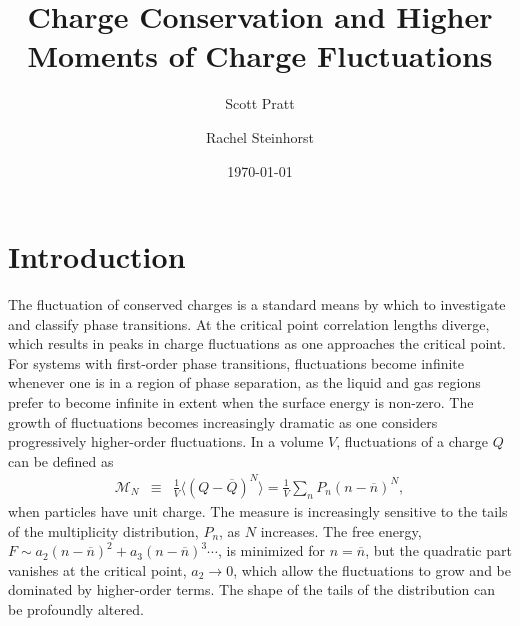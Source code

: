 \documentclass[aps,prc,nofootinbib,showpacs,superscriptaddress,groupedaddress]{revtex4-1}
\begin{document}
\title{Charge Conservation and Higher Moments of Charge Fluctuations}
\author{Scott Pratt}
\author{Rachel Steinhorst}
\date{\today}

\pacs{}

\begin{abstract}

\end{abstract}

\maketitle

\section{Introduction}\label{sec:intro}

The fluctuation of conserved charges is a standard means by which to investigate and classify phase transitions. At the critical point correlation lengths diverge, which results in peaks in charge fluctuations as one approaches the critical point. For systems with first-order phase transitions, fluctuations become infinite whenever one is in a region of phase separation, as the liquid and gas regions prefer to become infinite in extent when the surface energy is non-zero. The growth of fluctuations becomes increasingly dramatic as one considers progressively higher-order fluctuations. In a volume $V$, fluctuations of a charge $Q$ can be defined as
\begin{eqnarray}\label{eq:kappadef}
\mathcal{M}_N&\equiv&\frac{1}{V}\langle(Q-\overline{Q})^N\rangle=\frac{1}{V}\sum_n P_n(n-\overline{n})^N,
\end{eqnarray}
when particles have unit charge. The measure is increasingly sensitive to the tails of the multiplicity distribution, $P_n$, as $N$ increases. The free energy, $F\sim a_2(n-\overline{n})^2 + a_3(n-\overline{n})^3\cdots$, is minimized for $n=\overline{n}$, but the quadratic part vanishes at the critical point, $a_2\rightarrow 0$, which allow the fluctuations to grow and be dominated by higher-order terms. The shape of the tails of the distribution can be profoundly altered. 
\end{document}
